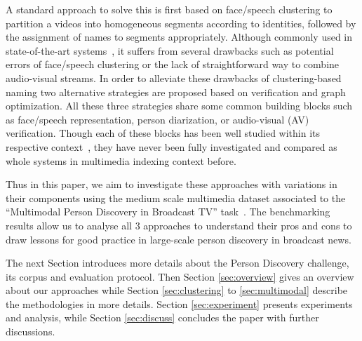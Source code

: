 A standard approach to solve this is first based on face/speech clustering to partition a videos into homogeneous segments according to identities, followed by the assignment of names to segments appropriately.
%
Although commonly used in state-of-the-art systems~\cite{le2015eumssi,poignant2012fusion}, it suffers from several drawbacks such as potential errors of face/speech clustering or the lack of straightforward way to combine audio-visual streams.
%
In order to alleviate these drawbacks of clustering-based naming %
two alternative strategies are proposed based on verification and graph optimization. 
%
All these three strategies share some common building blocks such as face/speech representation, person diarization, or audio-visual (AV) verification. Though each of these blocks has been well studied within its respective context~\cite{parkhi15deep,wallace2012total,Schroff2015,Ben},
%
they have never been fully investigated and compared as whole systems in  multimedia indexing context before. 

Thus in this paper, we  aim to investigate these approaches with variations in their components using the medium  scale multimedia dataset associated to the ``Multimodal Person Discovery in Broadcast TV'' task~\cite{POIGNANT--MEDIAEVAL--2015,bredin2016mediaeval}.
%
The benchmarking results allow us to analyse all 3 approaches to understand their pros and cons to draw lessons for good practice in large-scale person discovery in broadcast news.

The next Section introduces more details about the Person Discovery challenge, its corpus and evaluation protocol.
Then Section \ref{sec:overview} gives an overview about our approaches while Section \ref{sec:clustering} to \ref{sec:multimodal}
 describe the methodologies in more details.
Section \ref{sec:experiment} presents experiments and analysis, while 
Section \ref{sec:discuss} concludes the paper 
with further discussions.

\endinput
